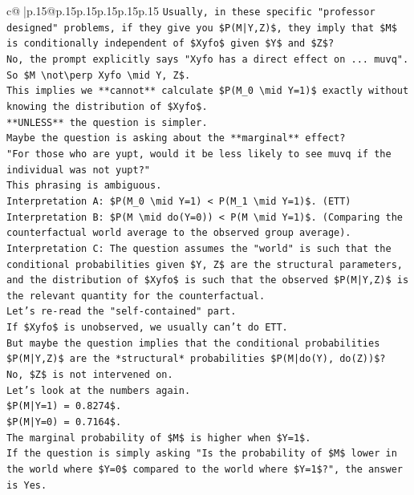 \documentclass{article}
\begin{document}
{\begin{supertabular}{c@{$\;$}|p{.15\linewidth}@{}p{.15\linewidth}p{.15\linewidth}p{.15\linewidth}p{.15\linewidth}p{.15\linewidth}}
{{{\texttt{Usually, in these specific "professor designed" problems, if they give you \$P(M|Y,Z)\$, they imply that \$M\$ is conditionally independent of \$Xyfo\$ given \$Y\$ and \$Z\$?} \\
\texttt{No, the prompt explicitly says "Xyfo has a direct effect on ... muvq".} \\
\texttt{So \$M \textbackslash{}not\textbackslash{}perp Xyfo \textbackslash{}mid Y, Z\$.} \\
\texttt{This implies we **cannot** calculate \$P(M\_0 \textbackslash{}mid Y=1)\$ exactly without knowing the distribution of \$Xyfo\$.} \\
\texttt{**UNLESS** the question is simpler.} \\
\texttt{Maybe the question is asking about the **marginal** effect?} \\
\texttt{"For those who are yupt, would it be less likely to see muvq if the individual was not yupt?"} \\
\texttt{This phrasing is ambiguous.} \\
\texttt{Interpretation A: \$P(M\_0 \textbackslash{}mid Y=1) < P(M\_1 \textbackslash{}mid Y=1)\$. (ETT)} \\
\texttt{Interpretation B: \$P(M \textbackslash{}mid do(Y=0)) < P(M \textbackslash{}mid Y=1)\$. (Comparing the counterfactual world average to the observed group average).} \\
\texttt{Interpretation C: The question assumes the "world" is such that the conditional probabilities given \$Y, Z\$ are the structural parameters, and the distribution of \$Xyfo\$ is such that the observed \$P(M|Y,Z)\$ is the relevant quantity for the counterfactual.} \\
\texttt{Let's re{-}read the "self{-}contained" part.} \\
\texttt{If \$Xyfo\$ is unobserved, we usually can't do ETT.} \\
\texttt{But maybe the question implies that the conditional probabilities \$P(M|Y,Z)\$ are the *structural* probabilities \$P(M|do(Y), do(Z))\$?} \\
\texttt{No, \$Z\$ is not intervened on.} \\
\texttt{Let's look at the numbers again.} \\
\texttt{\$P(M|Y=1) = 0.8274\$.} \\
\texttt{\$P(M|Y=0) = 0.7164\$.} \\
\texttt{The marginal probability of \$M\$ is higher when \$Y=1\$.} \\
\texttt{If the question is simply asking "Is the probability of \$M\$ lower in the world where \$Y=0\$ compared to the world where \$Y=1\$?", the answer is Yes.} \\
}}}
\end{supertabular}}
\end{document}
